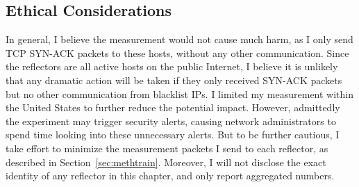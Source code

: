 \subsection{Ethical Considerations}
\label{sec:ethics}

In general, I believe the measurement would not cause much harm, as I only 
send TCP SYN-ACK packets to these hosts, without any other communication. Since
the reflectors are all active hosts on the public Internet, I believe it is
unlikely that any dramatic action will be taken if they only received SYN-ACK
packets but no other communication from blacklist IPs. I limited my
measurement within the United States to further reduce the potential impact.
However, admittedly the experiment may trigger security alerts, causing 
network administrators to spend time looking into these unnecessary alerts.
But to be further cautious, I take effort to minimize the
measurement packets I send to each reflector, as described in
Section~\ref{sec:methtrain}. Moreover, I will not disclose the exact
identity of any reflector in this chapter, and only report aggregated
numbers.

